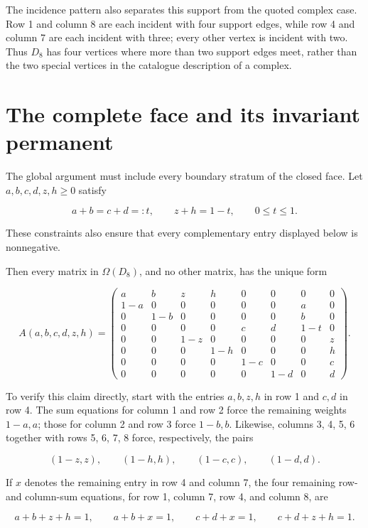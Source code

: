 \documentclass[11pt]{article}
\theoremstyle{definition}
\begin{document}
The incidence pattern also separates this support from the quoted complex
case. Row 1 and column 8 are each incident with four support edges, while row
4 and column 7 are each incident with three; every other vertex is incident
with two. Thus \(D_8\) has four vertices where more than two support edges
meet, rather than the two special vertices in the catalogue description of a
complex.

\section{The complete face and its invariant permanent}

The global argument must include every boundary stratum of the closed face.
Let \(a,b,c,d,z,h\ge0\) satisfy

\[
a+b=c+d=:t,\qquad z+h=1-t,\qquad 0\le t\le1.             \tag{3.1}
\]

These constraints also ensure that every complementary entry displayed below
is nonnegative.

Then every matrix in \(\Omega(D_8)\), and no other matrix, has the unique form

\[
A(a,b,c,d,z,h)=
\begin{pmatrix}
a&b&z&h&0&0&0&0\\
1-a&0&0&0&0&0&a&0\\
0&1-b&0&0&0&0&b&0\\
0&0&0&0&c&d&1-t&0\\
0&0&1-z&0&0&0&0&z\\
0&0&0&1-h&0&0&0&h\\
0&0&0&0&1-c&0&0&c\\
0&0&0&0&0&1-d&0&d
\end{pmatrix}.                                           \tag{3.2}
\]

To verify this claim directly, start with the entries \(a,b,z,h\) in row 1
and \(c,d\) in row 4. The sum equations for column 1 and row 2 force the
remaining weights \(1-a,a\); those for column 2 and row 3 force \(1-b,b\).
Likewise, columns 3, 4, 5, 6 together with rows 5, 6, 7, 8 force, respectively,
the pairs

\[
(1-z,z),\qquad(1-h,h),\qquad(1-c,c),\qquad(1-d,d).
\]

If \(x\) denotes the remaining entry in row 4 and column 7, the four remaining
row- and column-sum equations, for row 1, column 7, row 4, and column 8, are

\[
a+b+z+h=1,\qquad a+b+x=1,
\qquad c+d+x=1,\qquad c+d+z+h=1.
\]
\end{document}
